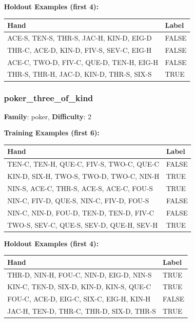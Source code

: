 \documentclass[10pt,a4paper]{article}
\begin{document}
\textbf{Holdout Examples (first 4):}

\begin{small}
\begin{tabular}{p{8cm}l}
\toprule
Hand & Label \\
\midrule
ACE-S, TEN-S, THR-S, JAC-H, KIN-D, EIG-D & \textcolor{negative}{FALSE} \\
THR-C, ACE-D, KIN-D, FIV-S, SEV-C, EIG-H & \textcolor{negative}{FALSE} \\
ACE-C, TWO-D, FIV-C, QUE-D, TEN-H, EIG-H & \textcolor{negative}{FALSE} \\
THR-S, THR-H, JAC-D, KIN-D, THR-S, SIX-S & \textcolor{positive}{TRUE} \\
\bottomrule
\end{tabular}
\end{small}

\vspace{0.5cm}

\subsubsection{poker\_three\_of\_kind}

\textbf{Family}: poker, \textbf{Difficulty}: 2

\textbf{Training Examples (first 6):}

\begin{small}
\begin{tabular}{p{8cm}l}
\toprule
Hand & Label \\
\midrule
TEN-C, TEN-H, QUE-C, FIV-S, TWO-C, QUE-C & \textcolor{negative}{FALSE} \\
KIN-D, SIX-H, TWO-S, TWO-D, TWO-C, NIN-H & \textcolor{positive}{TRUE} \\
NIN-S, ACE-C, THR-S, ACE-S, ACE-C, FOU-S & \textcolor{positive}{TRUE} \\
NIN-C, FIV-D, QUE-S, NIN-C, FIV-D, FOU-S & \textcolor{negative}{FALSE} \\
NIN-C, NIN-D, FOU-D, TEN-D, TEN-D, FIV-C & \textcolor{negative}{FALSE} \\
TWO-S, SEV-C, QUE-S, SEV-D, QUE-H, SEV-H & \textcolor{positive}{TRUE} \\
\bottomrule
\end{tabular}
\end{small}

\textbf{Holdout Examples (first 4):}

\begin{small}
\begin{tabular}{p{8cm}l}
\toprule
Hand & Label \\
\midrule
THR-D, NIN-H, FOU-C, NIN-D, EIG-D, NIN-S & \textcolor{positive}{TRUE} \\
KIN-C, TEN-D, SIX-D, KIN-D, KIN-S, QUE-C & \textcolor{positive}{TRUE} \\
FOU-C, ACE-D, EIG-C, SIX-C, EIG-H, KIN-H & \textcolor{negative}{FALSE} \\
JAC-H, TEN-D, THR-C, THR-D, SIX-D, THR-S & \textcolor{positive}{TRUE} \\
\bottomrule
\end{tabular}
\end{small}
\end{document}
